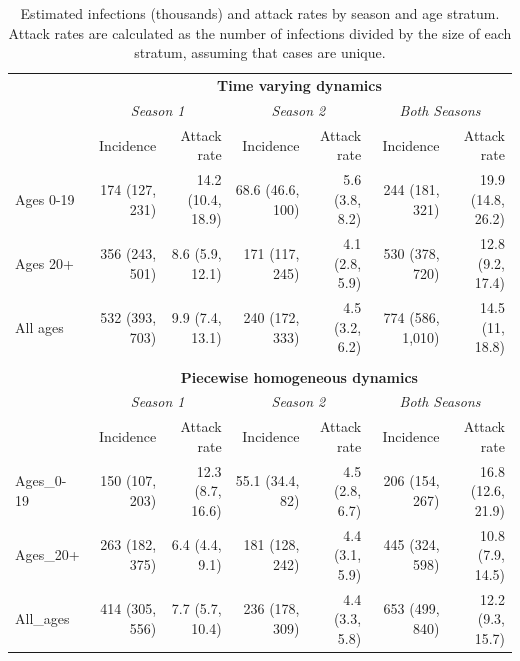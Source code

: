 \begin{table}
	\caption{Estimated infections (thousands) and attack rates by season and age stratum. Attack rates are calculated as the number of infections divided by the size of each stratum, assuming that cases are unique.}
	\label{tab:flu_attack_rates}
	\centering\footnotesize
	\begin{tabular}{lrrrrrr}
		\hline
		&\multicolumn{6}{c}{\textbf{Time varying dynamics}}\\
		\cmidrule{2-7} & \multicolumn{2}{c}{\textit{Season 1}} & \multicolumn{2}{c}{\textit{Season 2}} & \multicolumn{2}{c}{\textit{Both Seasons}}\\
		\cmidrule(r){2-3}\cmidrule(lr){4-5}\cmidrule(l){6-7} & 
		Incidence & Attack rate & Incidence & Attack rate & Incidence & Attack rate \\
		\hline
	Ages 0-19 & 174 (127, 231) & 14.2 (10.4, 18.9) & 68.6 (46.6, 100) & 5.6 (3.8, 8.2) & 244 (181, 321) & 19.9 (14.8, 26.2)\\
	Ages 20+ & 356 (243, 501) & 8.6 (5.9, 12.1) & 171 (117, 245) & 4.1 (2.8, 5.9) & 530 (378, 720) & 12.8 (9.2, 17.4)\\
	All ages & 532 (393, 703) & 9.9 (7.4, 13.1) & 240 (172, 333) & 4.5 (3.2, 6.2) & 774 (586, 1,010) & 14.5 (11, 18.8)\\
		\hline &&&&&&\\
		&\multicolumn{6}{c}{\textbf{Piecewise homogeneous dynamics}}\\
		\cmidrule{2-7}	& \multicolumn{2}{c}{\textit{Season 1}} & \multicolumn{2}{c}{\textit{Season 2}} & \multicolumn{2}{c}{\textit{Both Seasons}}\\
	\cmidrule(r){2-3}\cmidrule(lr){4-5}\cmidrule(l){6-7} & 
	Incidence & Attack rate & Incidence & Attack rate & Incidence & Attack rate \\
	\hline
	Ages\_0-19 & 150 (107, 203) & 12.3 (8.7, 16.6) & 55.1 (34.4, 82) & 4.5 (2.8, 6.7) & 206 (154, 267) & 16.8 (12.6, 21.9)\\
	\hline
	Ages\_20+ & 263 (182, 375) & 6.4 (4.4, 9.1) & 181 (128, 242) & 4.4 (3.1, 5.9) & 445 (324, 598) & 10.8 (7.9, 14.5)\\
	\hline
	All\_ages & 414 (305, 556) & 7.7 (5.7, 10.4) & 236 (178, 309) & 4.4 (3.3, 5.8) & 653 (499, 840) & 12.2 (9.3, 15.7)\\
		\hline
	\end{tabular}
\end{table}

